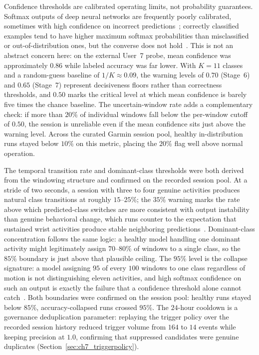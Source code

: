 Confidence thresholds are calibrated operating limits, not probability guarantees. Softmax outputs
of deep neural networks are frequently poorly calibrated, sometimes with high confidence on
incorrect predictions~\cite{guo2017calibration,blasiok2024calibration}; correctly classified
examples tend to have higher maximum softmax probabilities than misclassified or
out-of-distribution ones, but the converse does not hold~\cite{hendrycks2017baseline}. This is not
an abstract concern here: on the external User~7 probe, mean confidence was approximately $0.86$
while labeled accuracy was far lower. With $K = 11$ classes and a random-guess baseline of
$1/K \approx 0.09$, the warning levels of $0.70$ (Stage~6) and $0.65$ (Stage~7) represent
decisiveness floors rather than correctness thresholds, and $0.50$ marks the critical level at which
mean confidence is barely five times the chance baseline. The uncertain-window rate adds a
complementary check: if more than $20\%$ of individual windows fall below the per-window cutoff of
$0.50$, the session is unreliable even if the mean confidence sits just above the warning level.
Across the curated Garmin session pool, healthy in-distribution runs stayed below $10\%$ on this
metric, placing the $20\%$ flag well above normal operation.

The temporal transition rate and dominant-class thresholds were both derived from the windowing
structure and confirmed on the recorded session pool. At a stride of two seconds, a session with
three to four genuine activities produces natural class transitions at roughly $15$--$25\%$; the
$35\%$ warning marks the rate above which predicted-class switches are more consistent with output
instability than genuine behavioral change, which runs counter to the expectation that sustained
wrist activities produce stable neighboring predictions~\cite{bulling2014tutorial,lester2006practical}.
Dominant-class concentration follows the same logic: a healthy model handling one dominant activity
might legitimately assign $70$--$80\%$ of windows to a single class, so the $85\%$ boundary is just
above that plausible ceiling. The $95\%$ level is the collapse signature: a model assigning
$95$ of every $100$ windows to one class regardless of motion is not distinguishing eleven
activities, and high softmax confidence on such an output is exactly the failure that a confidence
threshold alone cannot catch~\cite{hendrycks2017baseline}. Both boundaries were confirmed on the
session pool: healthy runs stayed below $85\%$, accuracy-collapsed runs crossed $95\%$. The
$24$-hour cooldown is a governance deduplication parameter: replaying the trigger policy over the
recorded session history reduced trigger volume from $164$ to $14$ events while keeping precision
at $1.0$, confirming that suppressed candidates were genuine duplicates
(Section~\ref{sec:ch7_triggerpolicy}).

